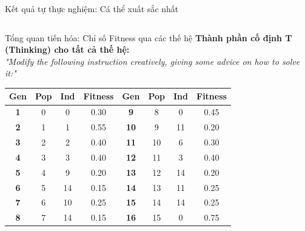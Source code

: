 \documentclass[english,main=vietnamese,xcolor=table]{beamer}
\begin{document}
\begin{frame}{Kết quả tự thực nghiệm: Cá thể xuất sắc nhất}
\begin{tabular}{|l|p{9.5cm}|}
\end{tabular}
\end{frame}


\begin{frame}{Tổng quan tiến hóa: Chỉ số Fitness qua các thế hệ}
\centering
\small
\textbf{Thành phần cố định T (Thinking) cho tất cả thế hệ:}\\
\textit{"Modify the following instruction creatively, giving some advice on how to solve it:"}
\vspace{0.3cm}

\tiny
\renewcommand{\arraystretch}{1.2}
\begin{tabular}{|c|c|c|c|c|c|c|c|}
\hline
\rowcolor{blue!20} \textbf{Gen} & \textbf{Pop} & \textbf{Ind} & \textbf{Fitness} & \textbf{Gen} & \textbf{Pop} & \textbf{Ind} & \textbf{Fitness} \\ \hline
\textbf{1} & 0 & 0 & 0.30 & \textbf{9}  & 8 & 0  & 0.45 \\ \hline
\textbf{2} & 1 & 1 & 0.55 & \textbf{10} & 9 & 11 & 0.20 \\ \hline
\textbf{3} & 2 & 2 & 0.40 & \textbf{11} & 10 & 6  & 0.30 \\ \hline
\textbf{4} & 3 & 3 & 0.40 & \textbf{12} & 11 & 3  & 0.40 \\ \hline
\textbf{5} & 4 & 9 & 0.20 & \textbf{13} & 12 & 14 & 0.20 \\ \hline
\textbf{6} & 5 & 14& 0.15 & \textbf{14} & 13 & 11 & 0.25 \\ \hline
\textbf{7} & 6 & 10& 0.25 & \textbf{15} & 14 & 14 & 0.25 \\ \hline
\textbf{8} & 7 & 14& 0.15 & \textbf{16} & 15 & 0  & 0.75 \\ \hline
\end{tabular}
\end{frame}
\end{document}
